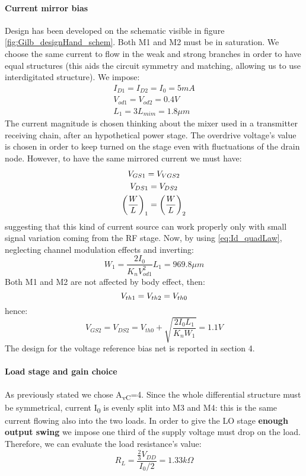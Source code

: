 \paragraph{Current mirror bias}
Design has been developed on the schematic visible in figure \ref{fig:Gilb_designHand_schem}.
Both M1 and M2 must be in saturation. We choose the same current to flow in the weak and strong branches in order to have equal structures (this aids the circuit symmetry and matching, allowing us to use interdigitated structure). We impose:
\begin{gather}
I_{D1} = I_{D2} = I_0 = 5 mA  \\
V_{od1}=V_{od2}=0.4 V  \\
L_1 =3 L_{mim} = 1.8 \mu m 
\end{gather} 
The current magnitude is chosen thinking about the mixer used in a transmitter receiving chain, after an hypothetical power stage. The overdrive voltage's value is chosen in order to keep turned on the stage even with fluctuations of the drain node. However, to have the same mirrored current we must have:
\begin{gather}
	V_{GS1} = V_{VGS2} \notag \\
	V_{DS1} = V_{DS2} \notag \\
	\left(\frac{W}{L}\right)_1 = \left(\frac{W}{L}\right)_2 \notag 
\end{gather}
suggesting that this kind of current source can work properly only with small signal variation coming from the RF stage. Now, by using \ref{eq:Id_quadLaw}, neglecting channel modulation effects and inverting:
\begin{equation}
W_1 = \frac{2I_0}{K_n V_{od1}^2}L_1 = 969.8 \mu m
\end{equation}
Both M1 and M2 are not affected by body effect, then:
\begin{equation}
	V_{th1}=V_{th2}=V_{th0} \notag \\
\end{equation}
hence:
\begin{equation}
V_{GS2}=V_{DS2}= V_{th0}+\sqrt{\frac{2I_0L_1}{K_n W_1 }} = 1.1 V
\end{equation}
The design for the voltage reference bias net is reported in section 4.
\paragraph{Load stage and gain choice}
As previously stated we chose A\textsubscript{vC}=4. 
Since the whole differential structure must be symmetrical, current I\textsubscript{0} is evenly split into M3 and M4: this is the same current flowing also into the two loads. In order to give the LO stage \textbf{enough output swing} we impose one third of the supply voltage must drop on the load. Therefore, we can evaluate the load resistance's value:
\begin{equation}
R_L = \frac{\frac{2}{3}V_{DD}}{I_0/2} = 1.33 k\Omega
\end{equation}

